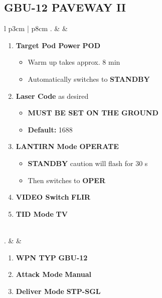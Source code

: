 \documentclass[8pt,usenames,dvipsnames,twoside]{article}
\begin{document}
		\subsection{GBU-12 PAVEWAY II}
		\begin{center}
			\begin{longtable}{l p{3cm} | p{8cm}}
				. &  & 
				\begin{minipage}[t]{\linewidth}
					\vspace{-7pt}
					\begin{enumerate}[label=(\alph*)]
						\item \textbf{Target Pod Power} \dotfill \textbf{POD}
						\begin{itemize}
							\item Warm up takes approx. 8 min
							\item Automatically switches to \textbf{STANDBY}
						\end{itemize}
						\item \textbf{Laser Code} \dotfill as desired
						\begin{itemize}
							\item \textbf{MUST BE SET ON THE GROUND}
							\item \textbf{Default:} 1688
						\end{itemize}
						\item \textbf{LANTIRN Mode} \dotfill \textbf{OPERATE}
						\begin{itemize}
							\item \textbf{STANDBY} caution will flash for 30 s
							\item Then switches to \textbf{OPER}
						\end{itemize}
						\item \textbf{VIDEO Switch} \dotfill \textbf{FLIR}
						\item \textbf{TID Mode} \dotfill \textbf{TV}
					\end{enumerate}
				\end{minipage} \\
				. &  & 
				\begin{minipage}[t]{\linewidth}
					\vspace{-7pt}
					\begin{enumerate}[label=(\alph*)]
						\item \textbf{WPN TYP} \dotfill \textbf{GBU-12}
						\item \textbf{Attack Mode} \dotfill \textbf{Manual}
						\item \textbf{Deliver Mode} \dotfill \textbf{STP-SGL}

\end{enumerate}
\end{minipage}
\end{longtable}
\end{center}
\end{document}
